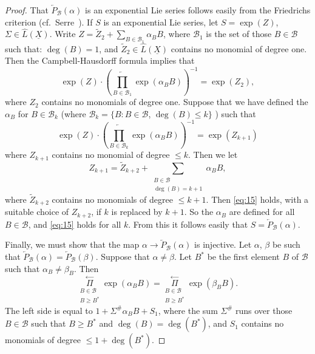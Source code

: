 \documentclass[leqno]{article}
\theoremstyle{plain}
\begin{document}
\begin{proof}
	That $\overleftarrow{P}_\mathcal{B}(\alpha)$ is an exponential Lie series follows easily from the Friedrichs criterion (cf.\ Serre~\cite{2}). 
	If $S$ is an exponential Lie series, let $S=\exp (Z)$, $\Sigma \in \hat{L}(\underline{X})$. 
	Write $Z=\tilde{Z}_{2}+\sum_{B \in \mathcal{B}_{1}} \alpha_{B} B$, where $\mathcal{B}_{1}$ is the set of those $B \in \mathcal{B}$ such that: $\operatorname{deg}(B)=1$, and $\tilde{Z}_{2} \in \hat{L}(\underline{X})$ contains no monomial of degree one. Then the Campbell-Hausdorff formula implies that
	\begin{equation}
		\exp(Z) \cdot \left( \overleftarrow{\prod_{B \in \mathcal{B}_1}} \exp (\alpha_B B) \right)^{-1} = \exp(Z_2),
	\end{equation}
	where $Z_{2}$ contains no monomials of degree one. Suppose that we have defined the $\alpha_B$ for $B \in \mathcal{B}_{k}$ (where $\mathcal{B}_{k}=\{B: B \in \mathcal{B}$, $\operatorname{deg}(B) \leq k\}$ ) such that
	\begin{equation} \label{eq:15}
		\exp (Z) \cdot\left(\overleftarrow{\prod_{B \in \mathcal{B}_{k}}} \exp \left(\alpha_{B} B\right)\right)^{-1}=\exp \left(Z_{k+1}\right)
	\end{equation}
	where $Z_{k+1}$ contains no monomial of degree $\leq k$. Then we let
	\begin{equation*}
		Z_{k+1}=\tilde{Z}_{k+2}+\sum_{\substack{B \in \mathcal{B} \\ \operatorname{deg}(B)=k+1}} \alpha_{B} B,
	\end{equation*}
	where $\tilde{Z}_{k+2}$ contains no monomials of degree $\leq k+1$. Then \eqref{eq:15} holds, with a suitable choice of $Z_{k+2}$, if $k$ is replaced by $k+1$. So the $\alpha_{B}$ are defined for all $B \in \mathcal{B}$, and \eqref{eq:15} holds for all $k$. 
	From this it follows easily that $S=\overleftarrow{P}_{\mathcal{B}}(\alpha)$.

	Finally, we must show that the map $\alpha \rightarrow \overleftarrow{P}_{\mathcal{B}}(\alpha)$ is injective. 
	Let $\alpha$, $\beta$ be such that $\overleftarrow{P}_{\mathcal{B}}(\alpha) = \overleftarrow{P}_{\mathcal{B}}(\beta)$. 
	Suppose that $\alpha \neq \beta$. 
	Let $B^{*}$ be the first element $B$ of $\mathcal{B}$ such that $\alpha_{B} \neq \beta_{B}$. 
	Then
	\begin{equation} \label{eq:16}
		\underset{\substack{B \in \mathcal{B}\\B \geq B^*}}{\stackrel{\leftarrow}{\Pi}} \exp \left(\alpha_{B} B\right)=\underset{\substack{B \in \mathcal{B}\\B \geq B^*}}{\stackrel{\leftarrow}{\Pi}} \exp \left(\beta_{B} B\right).
	\end{equation}
	The left side is equal to $1+\Sigma^{\#} \alpha_{B} B+S_{1}$, where the sum $\Sigma^{\#}$ runs over those $B \in \mathcal{B}$ such that $B \geq B^{*}$ and $\operatorname{deg}(B)=\operatorname{deg}\left(B^{*}\right)$, and $S_{1}$ contains no monomials of degree $\leq 1+\operatorname{deg}\left(B^{*}\right)$.


\end{proof}
\end{document}
